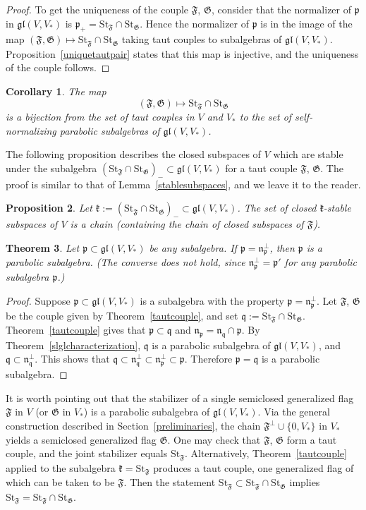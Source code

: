 \documentclass{article}
\newcommand {\St} {\mathrm{St}}
\def\gl{\mathfrak {gl}}
\def\n{\mathfrak {n}}
\def\p{\mathfrak {p}}
\def\k{\mathfrak{k}}
\def\q{\mathfrak{q}}
\def\F{\mathfrak{F}}
\def\G{\mathfrak{G}}
\newtheorem{thm}{Theorem}[section]
\newtheorem{prop}[thm]{Proposition}
\newtheorem{cor}[thm]{Corollary}
\begin{document}
\begin{proof}
To get the uniqueness of the couple $\F$, $\G$, consider that the normalizer of $\p$ in $\gl(V,V_*)$ is $\p_+ = \St_\F \cap \St_\G$.  Hence the normalizer of $\p$ is in the image of the map $(\F , \G) \mapsto \St_\F \cap \St_\G$ taking taut couples to subalgebras of $\gl(V,V_*)$. Proposition~\ref{uniquetautpair} states that this map is injective, and the uniqueness of the couple follows.
\end{proof}


\begin{cor}\label{selfnormalizingparabolics}
The map $$(\F,\G) \mapsto \St_\F \cap \St_\G$$ is a bijection from the set of taut couples in $V$ and $V_*$ to the set of self-normalizing parabolic subalgebras of $\gl(V,V_*)$.
\end{cor}


The following proposition describes the closed subspaces of $V$ which are stable under the subalgebra $(\St_\F \cap \St_\G)_- \subset \gl(V,V_*)$ for a taut couple $\F$, $\G$.  The proof is similar to that of Lemma~\ref{stablesubspaces}, and we leave it to the reader.


\begin{prop}
Let $\k := (\St_\F \cap \St_\G)_- \subset \gl(V,V_*)$.  The set of closed $\k$-stable subspaces of $V$ is a chain (containing the chain of closed subspaces of $\F$).
\end{prop}





\begin{thm}
Let $\p \subset \gl(V,V_*)$ be any subalgebra.  If $\p = \n_\p^\perp$, then $\p$ is a parabolic subalgebra.  (The converse does not hold, since $\n_\p^\perp = \p'$ for any parabolic subalgebra $\p$.)
\end{thm}

\begin{proof}
Suppose  $\p \subset \gl(V,V_*)$ is a subalgebra with the property $\p = \n_\p^\perp$.  Let $\F$, $\G$ be the couple given by Theorem~\ref{tautcouple}, and set $\q := \St_\F \cap \St_\G$.  Theorem~\ref{tautcouple} gives that $\p \subset \q$ and $\n_\p = \n_\q \cap \p$.  By Theorem~\ref{slglcharacterization}, $\q$ is a parabolic subalgebra of $\gl(V,V_*)$, and $\q \subset \n_\q^\perp$.  This shows that $\q \subset \n_\q^\perp \subset \n_\p^\perp \subset \p$.  Therefore $\p = \q$ is a parabolic subalgebra.
\end{proof}


It is worth pointing out that the stabilizer of a single semiclosed generalized flag $\F$ in $V$ (or $\G$ in $V_*$) is a parabolic subalgebra of $\gl(V,V_*)$.   Via the general construction described in Section~\ref{preliminaries}, the chain $\F^\perp \cup \{0,V_*\}$ in $V_*$ yields a semiclosed generalized flag $\G$.  One may check that $\F$, $\G$ form a taut couple, and the joint stabilizer equals $\St_\F$.  Alternatively, Theorem~\ref{tautcouple} applied to the subalgebra $\k = \St_\F$ produces a taut couple, one generalized flag of which can be taken to be $\F$.  Then the statement $\St_\F \subset \St_\F \cap \St_\G$ implies $\St_\F = \St_\F \cap \St_\G$.
\end{document}
